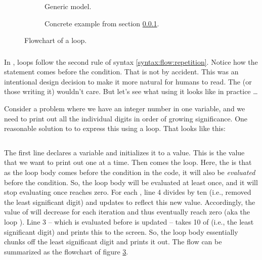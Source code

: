 \begin{figure}[tbp]
  \newcommand{\figscale}[0]{0.8}
  \begin{subfigure}[t]{0.5\textwidth}
    \centering
    \scalebox{\figscale}{}
    \caption{Generic model.}
    \label{fig:flow:repetition:dowhile}
  \end{subfigure}
  \begin{subfigure}[t]{0.5\textwidth}
    \centering
    \scalebox{\figscale}{}
    \caption{Concrete example from section \ref{sec:flow:repetition:dowhile:cs}.}
    \label{fig:flow:repetition:dowhile:concrete}
  \end{subfigure}
  \caption{Flowchart of a  loop.}
\end{figure}

\subsubsection{\csharp}
\label{sec:flow:repetition:dowhile:cs}

In \csharp,  loops follow the second rule of syntax \ref{syntax:flow:repetition}. Notice how the statement comes before the condition. That is not by accident. This was an intentional design decision to make it more natural for humans to read. The  (or those writing it) wouldn't care. But let's see what using it looks like in practice \ldots

Consider a problem where we have an integer number in one variable, and we need to print out all the individual digits in order of growing significance. One reasonable solution to to express this using a  loop. That looks like this:

\inputminted[linenos]{csharp}{../src/csharp/flow_repetition/dowhile/Program.cs}

The first line declares a variable and initializes it to a value. This is the value that we want to print out one  at a time. Then comes the  loop. Here, the  is that as the loop body comes before the condition in the code, it will also be \textsl{evaluated} before the condition. So, the loop body will be evaluated at least once, and it will stop evaluating once  reaches zero. For each , line 4 divides  by ten (i.e., removed the least significant digit) and updates  to reflect this new value. Accordingly, the value of  will decrease for each iteration and thus eventually reach zero (aka the loop ). Line 3 -- which is evaluated before  is updated -- takes  10 of  (i.e., the least significant digit) and prints this to the screen. So, the loop body essentially chunks off the least significant digit and prints it out. The flow can be summarized as the flowchart of figure \ref{fig:flow:repetition:dowhile:concrete}.

